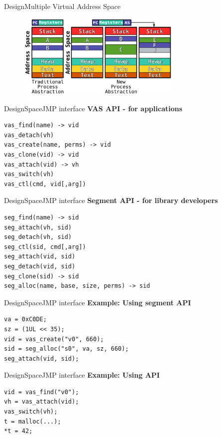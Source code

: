 \documentclass[10pt]{beamer}
\begin{document}
\begin{frame}{Design}{Multiple Virtual Address Space}
  \begin{figure}[ht]
    \centering
    \includegraphics[width=0.7\textwidth, keepaspectratio=true]{images/traditional_vs_new_b.png}
  \end{figure}
\end{frame}

\begin{frame}[fragile]{Design}{SpaceJMP interface}
  \textbf{VAS API - for applications}
\begin{lstlisting}
vas_find(name) -> vid
vas_detach(vh)
vas_create(name, perms) -> vid
vas_clone(vid) -> vid
vas_attach(vid) -> vh
vas_switch(vh)
vas_ctl(cmd, vid[,arg])
\end{lstlisting}
\end{frame}

\begin{frame}[fragile]{Design}{SpaceJMP interface}
  \textbf{Segment API - for library developers}
\begin{lstlisting}
seg_find(name) -> sid
seg_attach(vh, sid)
seg_detach(vh, sid)
seg_ctl(sid, cmd[,arg])
seg_attach(vid, sid)
seg_detach(vid, sid)
seg_clone(sid) -> sid
seg_alloc(name, base, size, perms) -> sid
\end{lstlisting}
\end{frame}

\begin{frame}[fragile]{Design}{SpaceJMP interface}
  \textbf{Example: Using segment API}
\begin{lstlisting}
va = 0xC0DE;
sz = (1UL << 35);
vid = vas_create("v0", 660);
sid = seg_alloc("s0", va, sz, 660);
seg_attach(vid, sid);
\end{lstlisting}
\end{frame}

\begin{frame}[fragile]{Design}{SpaceJMP interface}
  \textbf{Example: Using API}
\begin{lstlisting}
vid = vas_find("v0");
vh = vas_attach(vid);
vas_switch(vh);
t = malloc(...);
*t = 42;
\end{lstlisting}
\end{frame}
\end{document}
